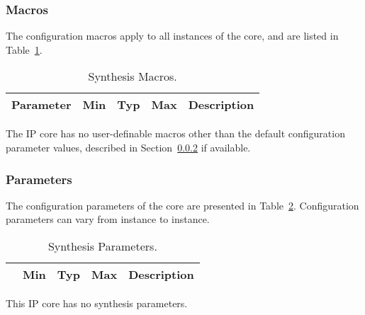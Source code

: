 \subsubsection{Macros}

\ifdefined\SM

The configuration macros apply to all instances of the core, and are listed in
Table~\ref{tab:sm}.

\begin{table}[h]
  \centering
    \begin{tabularx}{\textwidth}{ | c | c | c | c | X | }
    \hline
    \rowcolor{iob-green}
    {\bf Parameter} & {\bf Min} & {\bf Typ} & {\bf Max} & {\bf Description} \\\hline

    

    \end{tabularx}
  \caption{Synthesis Macros.}
  \label{tab:sm}
\end{table}

\noindent

\else
The IP core has no user-definable macros other than the default configuration parameter values, described in Section~\ref{sec:cp} if available.
\fi


\subsubsection{Parameters}
\label{sec:cp}
\ifdefined\SP

The configuration parameters of the core are presented in
Table~\ref{tab:sp}. Configuration parameters can vary from instance to instance.

\begin{table}[h]
  \centering
    \begin{tabular}{|l|c|c|c|p{9cm}|}
    \hline
    \rowcolor{iob-green}
    \multicolumn{1}{|c}{\bf Parameter} & \multicolumn{1}{|c|}{\bf Min} & \multicolumn{1}{c|}{\bf Typ} & \multicolumn{1}{c|}{\bf Max} & \multicolumn{1}{c|}{\bf Description}  \\ \hline \hline

    

    \end{tabular}
    
\caption{Synthesis Parameters.}
  \label{tab:sp}
\end{table}

\else

This IP core has no synthesis parameters.

\fi
